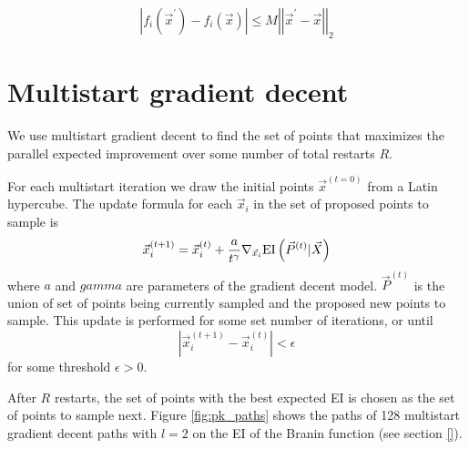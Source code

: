 \documentclass[phd,tocprelim]{cornell}
\begin{document}
\begin{equation}
    \left|f_{i}(\vec{x}^{\prime}) - f_{i}(\vec{x})\right| \leq M \left| \left| \vec{x}^{\prime} - \vec{x}\right|\right|_{2}
\end{equation}

\section{Multistart gradient decent}
\label{sec:multistart}

We use multistart gradient decent to find the set of points that maximizes the parallel expected improvement over some number of total restarts $R$.

For each multistart iteration we draw the initial points $\vec{x}^{(t=0)}$ from a Latin hypercube. The update formula for each $\vec{x}_{i}$ in the set of proposed points to sample is
\begin{equation}
    \vec{x}_{i}^{(t+1)} = \vec{x}_{i}^{(t)} + \frac{a}{t^{\gamma}} \nabla_{\vec{x}_{i}} {\rm EI}\left(\vec{P}^{(t)} | \vec{X}\right)
\end{equation}
where $a$ and $gamma$ are parameters of the gradient decent model. $\vec{P}^{(t)}$ is the union of set of points being currently sampled and the proposed new points to sample. This update is performed for some set number of iterations, or until
\begin{equation}
    |\vec{x}_{i}^{(t+1)} - \vec{x}_{i}^{(t)}| < \epsilon
\end{equation}
for some threshold $\epsilon > 0$.

After $R$ restarts, the set of points with the best expected EI is chosen as the set of points to sample next. Figure \ref{fig:pk_paths} shows the paths of 128 multistart gradient decent paths with $l = 2$ on the EI of the Branin function \cite{branin} (see section \ref{}).
\end{document}
